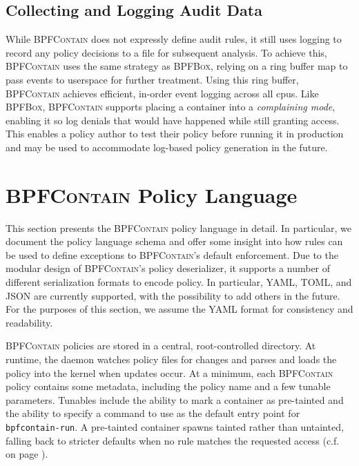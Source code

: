 \documentclass[
  fontsize=12pt,
  titlepage=firstiscover,
  paper=letter,
oneside,
  cleardoublepage=plain,
  parskip=half-,
  DIV=10,
  parindent,
  appendixprefix,
  chapterprefix,
  listof=totoc,
]{scrbook}
\newcommand{\bpfbox}{\textsc{BPFBox}}
\newcommand{\bpfcontain}{\textsc{BPFContain}}
\begin{document}
\subsection{Collecting and Logging Audit Data}\label{ss:bpfcontain-audit}

While \bpfcontain{} does not expressly define audit rules, it still uses logging to record
any policy decisions to a file for subsequent analysis. To achieve this, \bpfcontain{}
uses the same strategy as \bpfbox{}, relying on a ring buffer map to pass events to
userspace for further treatment. Using this ring buffer, \bpfcontain{} achieves efficient,
in-order event logging across all \glspl{cpu}. Like \bpfbox{}, \bpfcontain{} supports
placing a container into a \textit{complaining mode}, enabling it so log denials that
would have happened while still granting access. This enables a policy author to test
their policy before running it in production and may be used to accommodate log-based
policy generation in the future.



\section{\bpfcontain{} Policy Language}\label{s:bpfcontain-policy}

This section presents the \bpfcontain{} policy language in detail. In particular, we
document the policy language schema and offer some insight into how rules can be used to
define exceptions to \bpfcontain{}'s default enforcement. Due to the modular design of
\bpfcontain{}'s policy deserializer, it supports a number of different serialization
formats to encode policy. In particular, YAML, TOML, and JSON are currently supported,
with the possibility to add others in the future. For the purposes of this section, we
assume the YAML format for consistency and readability.

\bpfcontain{} policies are stored in a central, root-controlled directory. At runtime, the
daemon watches policy files for changes and parses and loads the policy into the kernel
when updates occur. At a minimum, each \bpfcontain{} policy contains some metadata,
including the policy name and a few tunable parameters. Tunables include the ability to
mark a container as pre-tainted and the ability to specify a command to use as the default
entry point for \texttt{bpfcontain-run}. A pre-tainted container spawns tainted rather than
untainted, falling back to stricter defaults when no rule matches the requested access
(c.f.\  on page \pageref{fig:bpfcontain-enforcement}).
\end{document}
